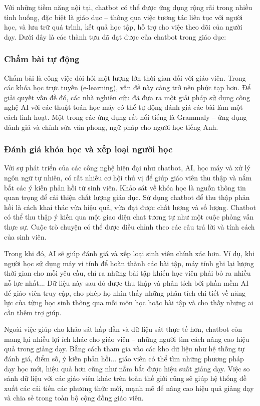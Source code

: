 Với những tiềm năng nội tại, chatbot có thể được ứng dụng rộng rãi trong nhiều tình huống, đặc biệt là giáo dục – thông qua việc tương tác liên tục với người học, và lưu trữ quá trình, kết quả học tập, hỗ trợ cho việc theo dõi của người dạy. Dưới đây là các thành tựu đã đạt được của chatbot trong giáo dục:
\subsubsection{Chấm bài tự động}
Chấm bài là công việc đòi hỏi một lượng lớn thời gian đối với giáo viên. Trong các khóa học trực tuyến (e-learning), vấn đề này càng trở nên phức tạp hơn. Để giải quyết vấn đề đó, các nhà nghiên cứu đã đưa ra một giải pháp sử dụng công nghệ AI với các thuật toán học máy có thể tự động đánh giá các bài làm một cách linh hoạt. Một trong các ứng dụng rất nổi tiếng là Grammaly – ứng dụng đánh giá và chỉnh sửa văn phong, ngữ pháp cho người học tiếng Anh.\par
\subsubsection{Đánh giá khóa học và xếp loại người học}
Với sự phát triển của các công nghệ hiện đại như chatbot, AI, học máy và xử lý ngôn ngữ tự nhiên, có rất nhiều cơ hội thú vị để giúp giáo viên thu thập và nắm bắt các ý kiến phản hồi từ sinh viên. Khảo sát về khóa học là nguồn thông tin quan trọng để cải thiện chất lượng giáo dục. Sử dụng chatbot để thu thập phản hồi là cách khai thác vừa hiệu quả, vừa đạt được chất lượng và số lượng. Chatbot có thể thu thập ý kiến qua một giao diện chat tương tự như một cuộc phỏng vấn thực sự. Cuộc trò chuyện có thể được điều chỉnh theo các câu trả lời và tính cách của sinh viên.\par
Trong khi đó, AI sẽ giúp đánh giá và xếp loại sinh viên chính xác hơn. Ví dụ, khi người học sử dụng máy vi tính để hoàn thành các bài tập, máy tính ghi lại lượng thời gian cho mỗi yêu cầu, chỉ ra những bài tập khiến học viên phải bỏ ra nhiều nỗ lực nhất... Dữ liệu này sau đó được thu thập và phân tích bởi phần mềm AI để giáo viên truy cập, cho phép họ nhìn thấy những phân tích chi tiết về năng lực của từng học sinh thông qua mỗi môn học hoặc bài tập và cho thấy những ai cần thêm trợ giúp.\par
Ngoài việc giúp cho khảo sát hấp dẫn và dữ liệu sát thực tế hơn, chatbot còn mang lại nhiều lợi ích khác cho giáo viên – những người tìm cách nâng cao hiệu quả trong giảng dạy. Bằng cách tham gia vào các kho dữ liệu như hệ thống tự đánh giá, điểm số, ý kiến phản hồi... giáo viên có thể tìm những phương pháp dạy học mới, hiệu quả hơn cũng như nắm bắt được hiệu suất giảng dạy. Việc so sánh dữ liệu với các giáo viên khác trên toàn thế giới cũng sẽ giúp hệ thống đề xuất các cải tiến các phương thức mới, mạnh mẽ để nâng cao hiệu quả giảng dạy và chia sẻ trong toàn bộ cộng đồng giáo viên.\par
